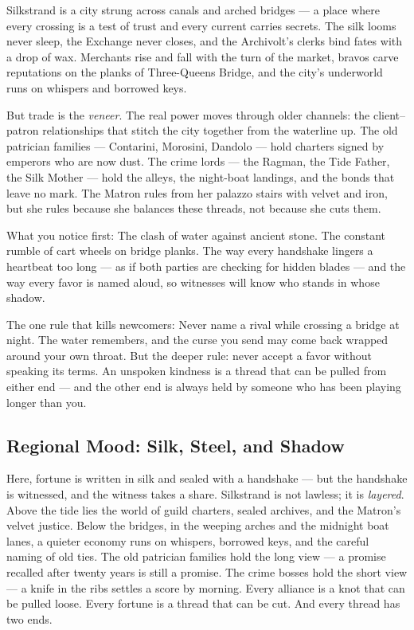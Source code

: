 \vspace{2mm}
\begin{tcolorbox}[colback=black!3,colframe=blue!60!black,title={Theme \& Atmosphere},breakable]
Silkstrand is a city strung across canals and arched bridges --- a place where every crossing is a test of trust and every current carries secrets. The silk looms never sleep, the Exchange never closes, and the Archivolt's clerks bind fates with a drop of wax. Merchants rise and fall with the turn of the market, bravos carve reputations on the planks of Three-Queens Bridge, and the city's underworld runs on whispers and borrowed keys.

But trade is the \emph{veneer}. The real power moves through older channels: the client--patron relationships that stitch the city together from the waterline up. The old patrician families --- Contarini, Morosini, Dandolo --- hold charters signed by emperors who are now dust. The crime lords --- the Ragman, the Tide Father, the Silk Mother --- hold the alleys, the night-boat landings, and the bonds that leave no mark. The Matron rules from her palazzo stairs with velvet and iron, but she rules because she balances these threads, not because she cuts them.

What you notice first: The clash of water against ancient stone. The constant rumble of cart wheels on bridge planks. The way every handshake lingers a heartbeat too long --- as if both parties are checking for hidden blades --- and the way every favor is named aloud, so witnesses will know who stands in whose shadow.

The one rule that kills newcomers: Never name a rival while crossing a bridge at night. The water remembers, and the curse you send may come back wrapped around your own throat. But the deeper rule: never accept a favor without speaking its terms. An unspoken kindness is a thread that can be pulled from either end --- and the other end is always held by someone who has been playing longer than you.
\end{tcolorbox}

\subsection*{Regional Mood: Silk, Steel, and Shadow}

Here, fortune is written in silk and sealed with a handshake --- but the handshake is witnessed, and the witness takes a share. Silkstrand is not lawless; it is \emph{layered}. Above the tide lies the world of guild charters, sealed archives, and the Matron's velvet justice. Below the bridges, in the weeping arches and the midnight boat lanes, a quieter economy runs on whispers, borrowed keys, and the careful naming of old ties. The old patrician families hold the long view --- a promise recalled after twenty years is still a promise. The crime bosses hold the short view --- a knife in the ribs settles a score by morning. Every alliance is a knot that can be pulled loose. Every fortune is a thread that can be cut. And every thread has two ends.

